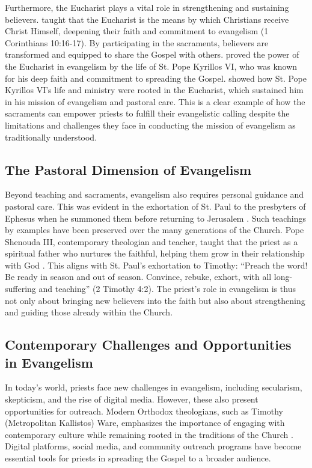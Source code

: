 \documentclass[12pt, doc]{apa7}   	%
\begin{document}
Furthermore, the Eucharist plays a vital role in strengthening and sustaining believers. \citet{st_basil_letters} taught that the Eucharist is the means by which Christians receive Christ Himself, deepening their faith and commitment to evangelism (1 Corinthians 10:16-17). By participating in the sacraments, believers are transformed and equipped to share the Gospel with others.  \citet{fanous_silent_patriarch} proved the power of the Eucharist in evangelism by the life of St. Pope Kyrillos VI, who was known for his deep faith and commitment to spreading the Gospel.  \citet{fanous_silent_patriarch} showed how St. Pope Kyrillos VI’s life and ministry were rooted in the Eucharist, which sustained him in his mission of evangelism and pastoral care.  This is a clear example of how the sacraments can empower priests to fulfill their evangelistic calling despite the limitations and challenges they face in conducting the mission of evangelism as traditionally understood.

\subsection{The Pastoral Dimension of Evangelism}

Beyond teaching and sacraments, evangelism also requires personal guidance and pastoral care.  This was evident in the exhortation of St. Paul to the presbyters of Ephesus when he summoned them before returning to Jerusalem \citep{paul_wright}.  Such teachings by examples have been preserved over the many generations of the Church. Pope Shenouda III, contemporary theologian and teacher, taught that the priest as a spiritual father who nurtures the faithful, helping them grow in their relationship with God \citep{priesthood_shenouda}. This aligns with St. Paul’s exhortation to Timothy: “Preach the word! Be ready in season and out of season. Convince, rebuke, exhort, with all long-suffering and teaching” (2 Timothy 4:2). The priest’s role in evangelism is thus not only about bringing new believers into the faith but also about strengthening and guiding those already within the Church.

\subsection{Contemporary Challenges and Opportunities in Evangelism}

In today’s world, priests face new challenges in evangelism, including secularism, skepticism, and the rise of digital media. However, these also present opportunities for outreach. Modern Orthodox theologians, such as Timothy (Metropolitan Kallistos) Ware, emphasizes the importance of engaging with contemporary culture while remaining rooted in the traditions of the Church \citep{orthodox_church_ware}. Digital platforms, social media, and community outreach programs have become essential tools for priests in spreading the Gospel to a broader audience.
\end{document}
